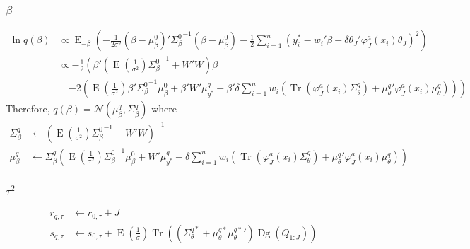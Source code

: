 \documentclass[11pt]{article}
\DeclareMathOperator{\Tr}{Tr}
\newcommand{\opn}{\operatorname}
\begin{document}
\subsubsection{$\beta$}
  \begin{align*}
    \ln q\left(\beta\right)&\propto \opn{E}_{-\beta}\left(-\frac{1}{2\sigma^{2}}\left(\beta-\mu_{\beta}^{0}\right)'{\Sigma_{\beta}^{0}}^{-1}\left(\beta-\mu_{\beta}^{0}\right)-\frac{1}{2}\sum_{i=1}^{n}\left(y_{i}^{*}-w_{i}'\beta -\delta\theta_{J}'\varphi_{J}^{a}\left(x_{i}\right)\theta_{J}\right)^{2} \right)\\
    &\propto -\frac{1}{2}\left(\beta'\left(\opn{E}\left(\frac{1}{\sigma^{2}}\right){\Sigma_{\beta}^{0}}^{-1} + W'W\right)\beta \right.\\
    &\quad  \left. -2\left(\opn{E}\left(\frac{1}{\sigma^{2}}\right)\beta'{\Sigma_{\beta}^{0}}^{-1}\mu_{\beta}^{0} +\beta'W'\mu_{y^{*}}^{q}-\beta'\delta\sum_{i=1}^{n}w_{i}\left(\Tr\left(\varphi_{J}^{a}\left(x_{i}\right)\Sigma_{\theta}^{q}\right)+{\mu_{\theta}^{q}}'\varphi_{J}^{a}\left(x_{i}\right)\mu_{\theta}^{q}\right)\right)\right)
  \end{align*}
Therefore, $q\left(\beta\right) = \mathcal{N}\left(\mu_{\beta}^{q}, \Sigma_{\beta}^{q}\right)$ where
\begin{align*}
  \Sigma_{\beta}^{q} &\leftarrow \left(\opn{E}\left(\frac{1}{\sigma^{2}}\right){\Sigma_{\beta}^{0}}^{-1} + W'W\right)^{-1}\\
  \mu_{\beta}^{q} &\leftarrow \Sigma_{\beta}^{q}\left(\opn{E}\left(\frac{1}{\sigma^{2}}\right) {\Sigma_{\beta}^{0}}^{-1}\mu_{\beta}^{0} +W'\mu_{y^{*}}^{q} -\delta\sum_{i=1}^{n}w_{i}\left(\Tr\left(\varphi_{J}^{a}\left(x_{i}\right)\Sigma_{\theta}^{q}\right) + {\mu_{\theta}^{q}}'\varphi_{J}^{a}\left(x_{i}\right)\mu_{\theta}^{q}\right)\right)
\end{align*}
\subsubsection{$\tau^{2}$}
  \begin{align*}
    r_{q,\tau} &\leftarrow r_{0,\tau} + J\\
    s_{q,\tau} &\leftarrow s_{0,\tau} + \opn{E}\left(\frac{1}{\sigma}\right)\Tr\left(\left(\Sigma_{\theta}^{q*} + \mu_{\theta}^{q*}{\mu_{\theta}^{q*}}'\right)\opn{Dg}\left(Q_{1:J}\right)\right)
  \end{align*}
\end{document}
